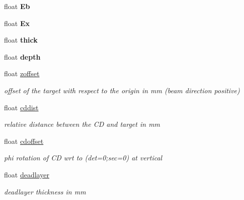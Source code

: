 \begin{DoxyCompactItemize}
float {\bfseries Eb}
\item 
\mbox{\label{classg__clx_a1f2096a705a986c48af8540f6eb1b835}} 
float {\bfseries Ex}
\item 
\mbox{\label{classg__clx_ada5b4790b6f1970cd350444564604e2f}} 
float {\bfseries thick}
\item 
\mbox{\label{classg__clx_a55b2ad47323975fbefd70314a1580d26}} 
float {\bfseries depth}
\item 
\mbox{\label{classg__clx_a85780ae170aef9d5362a47520ee3a822}} 
float \hyperlink{classg__clx_a85780ae170aef9d5362a47520ee3a822}{zoffset}
\begin{DoxyCompactList}\small\item\em offset of the target with respect to the origin in mm (beam direction positive) \end{DoxyCompactList}\item 
\mbox{\label{classg__clx_af6483d6ed4f21d91fe1ac7e88393ab4e}} 
float \hyperlink{classg__clx_af6483d6ed4f21d91fe1ac7e88393ab4e}{cddist}
\begin{DoxyCompactList}\small\item\em relative distance between the CD and target in mm \end{DoxyCompactList}\item 
\mbox{\label{classg__clx_a2f16d48f2601cfd6ccb100283f3cdab7}} 
float \hyperlink{classg__clx_a2f16d48f2601cfd6ccb100283f3cdab7}{cdoffset}
\begin{DoxyCompactList}\small\item\em phi rotation of CD wrt to (det=0;sec=0) at vertical \end{DoxyCompactList}\item 
\mbox{\label{classg__clx_a9868b722188e951233b134083dd63370}} 
float \hyperlink{classg__clx_a9868b722188e951233b134083dd63370}{deadlayer}
\begin{DoxyCompactList}\small\item\em deadlayer thickness in mm \end{DoxyCompactList}\item 
\mbox{\label{classg__clx_a9093a10412ab047b3b910e4c4a9d70d1}} 

\end{DoxyCompactItemize}
